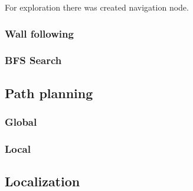 For exploration there was created navigation node. 

\subsubsection{Wall following}
\subsubsection{BFS Search}
\subsection{Path planning}
\subsubsection{Global}
\subsubsection{Local}
\subsection{Localization}
